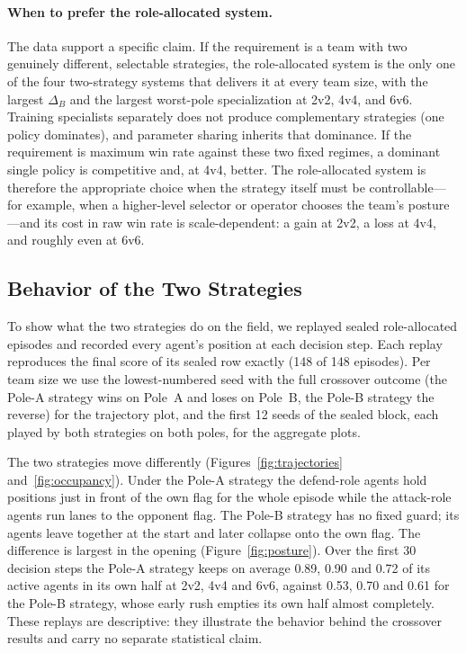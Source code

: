\paragraph{When to prefer the role-allocated system.}
The data support a specific claim. If the requirement is a team with two
genuinely different, selectable strategies, the role-allocated system is the
only one of the four two-strategy systems that delivers it at every team
size, with the largest
\(\Delta_B\) and the largest worst-pole specialization at 2v2, 4v4, and 6v6.
Training specialists separately does not produce complementary strategies
(one policy dominates), and parameter sharing inherits that dominance. If
the requirement is maximum win rate against these two fixed regimes, a
dominant single policy is competitive and, at 4v4, better. The
role-allocated system is therefore the appropriate choice when the
strategy itself must be controllable---for example, when a higher-level
selector or operator chooses the team's posture---and its cost in raw win
rate is scale-dependent: a gain at 2v2, a loss at 4v4, and roughly even at
6v6.

\subsection{Behavior of the Two Strategies}

To show what the two strategies do on the field, we replayed sealed
role-allocated episodes and recorded every agent's position at each decision
step. Each replay reproduces the final score of its sealed row exactly
(148 of 148 episodes). Per team size we use the lowest-numbered seed with the
full crossover outcome (the Pole-A strategy wins on Pole~A and loses on
Pole~B, the Pole-B strategy the reverse) for the trajectory plot, and the
first 12 seeds of the sealed block, each played by both strategies on both
poles, for the aggregate plots.

The two strategies move differently (Figures~\ref{fig:trajectories}
and~\ref{fig:occupancy}). Under the Pole-A strategy the defend-role agents
hold positions just in front of the own flag for the whole episode while the
attack-role agents run lanes to the opponent flag. The Pole-B strategy has no
fixed guard; its agents leave together at the start and later collapse onto
the own flag. The difference is largest in the opening
(Figure~\ref{fig:posture}). Over the first 30 decision steps the Pole-A
strategy keeps on average 0.89, 0.90 and 0.72 of its active agents in its
own half at 2v2, 4v4 and 6v6, against 0.53, 0.70 and 0.61 for the Pole-B
strategy, whose early rush empties its own half almost completely. These
replays are descriptive: they illustrate the behavior behind the crossover
results and carry no separate statistical claim.

